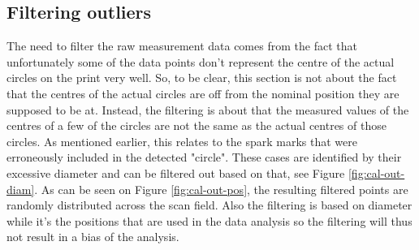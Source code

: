 \subsection{Filtering outliers} \label{sec:filtering}
The need to filter the raw measurement data comes from the fact that unfortunately some of the data points don't represent the centre of the actual circles on the print very well. So, to be clear, this section is not about the fact that the centres of the actual circles are off from the nominal position they are supposed to be at. Instead, the filtering is about that the measured values of the centres of a few of the circles are not the same as the actual centres of those circles. As mentioned earlier, this relates to the spark marks that were erroneously included in the detected "circle". These cases are identified by their excessive diameter and can be filtered out based on that, see Figure \ref{fig:cal-out-diam}. As can be seen on Figure \ref{fig:cal-out-pos}, the resulting filtered points are randomly distributed across the scan field. Also the filtering is based on diameter while it's the positions that are used in the data analysis so the filtering will thus not result in a bias of the analysis.

